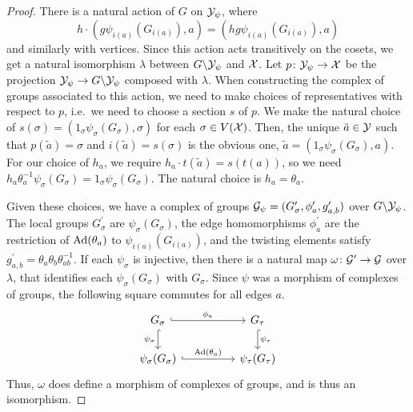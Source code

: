 \begin{proof}
	There is a natural action of $G$ on  $\mathcal{Y}_\psi$, where
	\[
		h \cdot (g\psi_{i(a)}(G_{i(a)}), a) = (hg\psi_{i(a)}(G_{i(a)}), a)
	\]
	and similarly with vertices.
	Since this action acts transitively on the cosets, we get a natural isomorphism $\lambda$ between $G \backslash \mathcal{Y}_\psi$ and  $\mathcal{X}$.
	Let $p \colon \mathcal{Y}_\psi \to \mathcal{X}$ be the projection $\mathcal{Y}_\psi \to G \backslash \mathcal{Y}_\psi$ composed with $\lambda$.
	When constructing the complex of groups associated to this action, we need to make choices of representatives with respect to $p$, i.e.~we need to choose a section $s$ of $p$.
	We make the natural choice of $s(\sigma) = (1_\sigma \psi_\sigma(G_\sigma), \sigma)$ for each $\sigma \in V(\mathcal{X})$.
	Then, the unique $\tilde{a} \in \mathcal{Y}$ such that $p(\tilde{a}) = \sigma$ and $i(\tilde{a}) = s(\sigma)$ is the obvious one, $\tilde{a} = (1_\sigma\psi_\sigma(G_\sigma), a)$.
	For our choice of $h_a$, we require  $h_a \cdot t(\tilde{a}) = s(t(a))$, so we need $h_a\theta_a^{-1}\psi_\sigma(G_\sigma) = 1_\sigma \psi_\sigma(G_\sigma)$.
	The natural choice is $h_a = \theta_a$.

	Given these choices, we have a complex of groups $\mathcal{G}_\psi = (G^\prime_\sigma, \phi^\prime_a, g^\prime_{a,b})$ over $G \backslash \mathcal{Y}_\psi$.
	The local groups $G^\prime_\sigma$ are $\psi_\sigma(G_\sigma)$, the edge homomorphisms  $\phi^\prime_a$ are the restriction of $\operatorname{Ad}(\theta_a)$ to $\psi_{i(a)}(G_{i(a)})$, and the twisting elements satisfy $g^\prime_{a,b} = \theta_a\theta_b\theta_{ab}^{-1}$.
	If each $\psi_\sigma$ is injective, then there is a natural map $\omega \colon \mathcal{G}^\prime \to \mathcal{G}$ over $\lambda$, that identifies each $\psi_\sigma(G_\sigma)$ with $G_\sigma$.
	Since  $\psi$ was a morphism of complexes of groups, the following square commutes for all edges $a$.
	\[
		\begin{tikzcd}
			G_\sigma \ar[d, hook, "\psi_\sigma"'] \ar[rr, hook, "\phi_a"] && G_\tau \ar[d, hook, "\psi_\tau"] \\
			\psi_\sigma(G_\sigma) \ar[rr, hook, "\ad(\theta_a)"] && \psi_\tau(G_\tau)
		\end{tikzcd}
	\]
	Thus, $\omega$ does define a morphism of complexes of groups, and is thus an isomorphism.
\end{proof}

